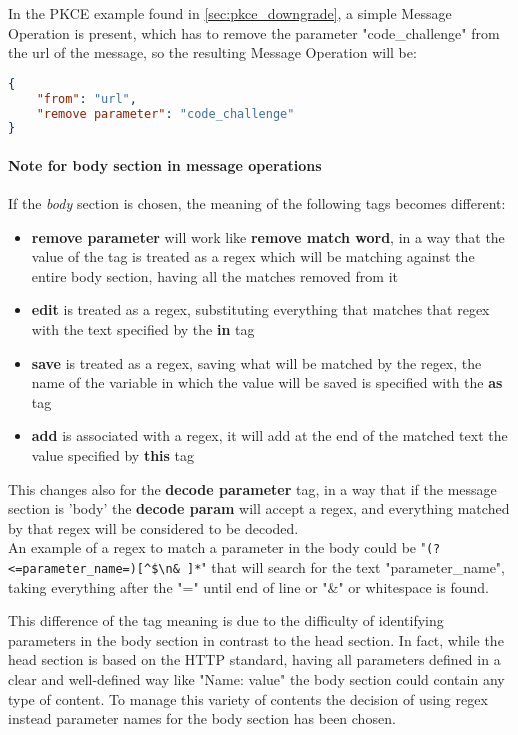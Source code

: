 In the PKCE example found in \ref{sec:pkce_downgrade}, a simple Message Operation is present, which has to remove the parameter "code\_challenge" from the url of the message, so the resulting Message Operation will be:
\begin{lstlisting}[language=json, caption=Message Operation definition]
{
    "from": "url",
    "remove parameter": "code_challenge"
}
\end{lstlisting}

\paragraph{Note for body section in message operations}
If the \textit{body} section is chosen, the meaning of the following tags becomes different:
\begin{itemize}
    \item \textbf{remove parameter} will work like \textbf{remove match word}, in a way that the value of the tag is treated as a regex which will be matching against the entire body section, having all the matches removed from it
    \item \textbf{edit} is treated as a regex, substituting everything that matches that regex with the text specified by the \textbf{in} tag
    \item \textbf{save} is treated as a regex, saving what will be matched by the regex, the name of the variable in which the value will be saved is specified with the \textbf{as} tag
    \item \textbf{add} is associated with a regex, it will add at the end of the matched text the value specified by \textbf{this} tag
\end{itemize}

This changes also for the \textbf{decode parameter} tag, in a way that if the message section is 'body' the \textbf{decode param} will accept a regex, and everything matched by that regex will be considered to be decoded. \\ An example of a regex to match a parameter in the body could be "\verb|(?<=parameter_name=)[^$\n& ]*|" that will search for the text "parameter\_name", taking everything after the "=" until end of line or "\&" or whitespace is found.

This difference of the tag meaning is due to the difficulty of identifying parameters in the body section in contrast to the head section. In fact, while the head section is based on the HTTP standard, having all parameters defined in a clear and well-defined way like "Name: value" the body section could contain any type of content. To manage this variety of contents the decision of using regex instead parameter names for the body section has been chosen.

